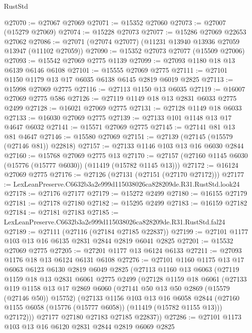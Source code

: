 \begin{lexlean}{RustStd}
\begin{coremodule}
@27070 := @27067 @27069
@27071 := @15352 @27060
@27073 := @27007 (@15279 @27069)
@27074 := @15228 @27073
@27077 := @15286 @27069 @22653 @27062
@27086 := @27071 (@27074 @27077) (@11231 @13940 @13936 @27059 @13947 (@11102 @27059))
@27090 := @15352 @27073 @27077 (@15509 @27006)
@27093 := @15542 @27069 @2775 @1139
@27099 := @27093 @1180 @18 @13 @6139 @6146 @6108
@27101 := @15555 @27069 @2775
@27111 := @27101 @1150 @1179 @13 @17 @6035 @6138 @6145 @2819 @6019 @2825
@27113 := @15998 @27069 @2775
@27116 := @27113 @1150 @13 @6035
@27119 := @16007 @27069 @2775 @586
@27126 := @27119 @1149 @18 @13 @2831 @6033 @2775 @2499
@27128 := @16021 @27069 @2775
@27131 := @27128 @1149 @18 @6033
@27133 := @16030 @27069 @2775
@27139 := @27133 @101 @1148 @13 @17 @4647 @6032
@27141 := @15571 @27069 @2775
@27145 := @27141 @81 @13 @81 @4647
@27146 := @15580 @27069
@27151 := @27139 (@27145 (@15579 (@27146 @81)) @22818)
@27157 := @27133 @1146 @103 @13 @16 @6030 @2844
@27160 := @15768 @27069 @2775 @13
@27170 := @27157 (@27160 @1145 @6030 (@15776 (@15777 @6030)) (@11419 (@15782 @1145 @13)))
@27172 := @16124 @27069 @2775
@27176 := @27126 (@27131 (@27151 (@27170 @27172)))
@27177 := LexLeanPreserve.C6632b3a2e999d115038026ca828209de.R31.RustStd.look24
@27178 := @27176 @27177
@27179 := @15272 @2499
@27180 := @16155 @27179
@27181 := @27178 @27180
@27182 := @15295 @2499
@27183 := @16159 @27182
@27184 := @27181 @27183
@27185 := LexLeanPreserve.C6632b3a2e999d115038026ca828209de.R31.RustStd.fal24
@27189 := @27111 (@27116 (@27184 @27185 @22837))
@27199 := @27101 @1177 @103 @13 @16 @6135 @2831 @2844 @2819 @6041 @2825
@27201 := @15532 @27069 @2775
@27205 := @27201 @1177 @13 @6124 @6133
@27211 := @27093 @1176 @18 @13 @6124 @6131 @6108
@27276 := @27101
    @1160
    @1175
    @13
    @17
    @6063
    @6123
    @6130
    @2819
    @6049
    @2825
    (@27113
      @1160
      @13
      @6063
      (@27119
        @1159
        @18
        @13
        @2831
        @6061
        @2775
        @2499
        (@27128
          @1159
          @18
          @6061
          (@27133
            @119
            @1158
            @13
            @17
            @2869
            @6060
            (@27141 @50 @13 @50 @2869 (@15579 (@27146 @50)) @15752)
            (@27133
              @1156
              @103
              @13
              @16
              @6058
              @2844
              (@27160 @1155 @6058 (@15776 (@15777 @6058)) (@11419 (@15782 @1155 @13)))
              @27172)))
        @27177
        @27180
        @27183
        @27185
        @22837))
@27286 := @27101 @1173 @103 @13 @16 @6120 @2831 @2844 @2819 @6069 @2825

\end{coremodule}
\end{lexlean}
